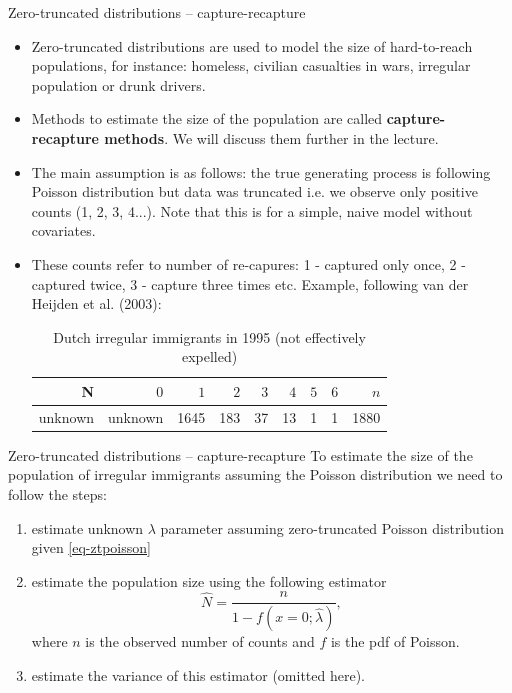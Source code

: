\documentclass[10pt,ignorenonframetext,aspectratio=169]{beamer}
\begin{document}
\begin{frame}{Zero-truncated distributions -- capture-recapture}
\begin{itemize}
    \justifying
    \item Zero-truncated distributions are used to model the size of hard-to-reach populations, for instance: homeless, civilian casualties in wars, irregular population or drunk drivers.
    \item Methods to estimate the size of the population are called \textbf{capture-recapture methods}. We will discuss them further in the lecture.
    \item The main assumption is as follows: the true generating process is following Poisson distribution but data was truncated i.e. we observe only positive counts (1, 2, 3, 4...). Note that this is for a simple, naive model without covariates.
    \item These counts refer to number of re-capures: 1 - captured only once, 2 - captured twice, 3 - capture three times etc. Example, following van der Heijden et al. (2003):
    \begin{table}
        \centering
        \caption{Dutch irregular immigrants in 1995 (not effectively expelled)}
        \begin{tabular}{r|rrrrrrr|r}
        \hline
        N    &  $0$ & $1$ & $2$ & $3$ & $4$  & $5$ & $6$ & $n$\\
        \hline
        unknown    &  unknown  & 1645 & 183 & 37 & 13 & 1 & 1 & 1880\\
         \hline     
        \end{tabular}
    \end{table}
\end{itemize}
\end{frame}


\begin{frame}{Zero-truncated distributions -- capture-recapture}
To estimate the size of the population of irregular immigrants assuming the Poisson distribution we need to follow the steps:
\begin{enumerate}
    \item estimate unknown $\lambda$ parameter assuming zero-truncated Poisson distribution given \eqref{eq-ztpoisson}
    \item estimate the population size using the following estimator
    \begin{equation}
        \hat{N} = \frac{n}{1 - f(x = 0; \hat{\lambda})},
    \end{equation}
    where $n$ is the observed number of counts and $f$ is the pdf of Poisson.
    \item estimate the variance of this estimator (omitted here).
\end{enumerate}
\end{frame}
\end{document}
